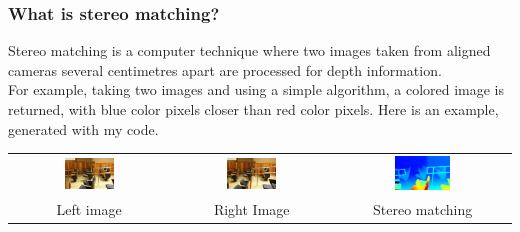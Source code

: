 \documentclass[19pt]{beamer}
\begin{document}
\begin{frame}
\frametitle{What is stereo matching?}

Stereo matching is a computer technique where two images taken from aligned cameras several centimetres apart are processed for depth information. \\[15pt]
%
For example, taking two images and using a simple algorithm, a colored image is returned, with blue color pixels closer than red color pixels. Here is an example, generated with my code.\\[20pt]

\centering
\setlength{}
\begin{tabular}{ccc}
\includegraphics[width=0.33\textwidth]{images/im0-600.jpg} &
\includegraphics[width=0.33\textwidth]{images/im1-600.jpg} &
\includegraphics[width=0.33\textwidth]{images/disp-600.jpg} \\[2pt]
Left image & Right Image & Stereo matching \\
\end{tabular}

\end{frame}
\end{document}
